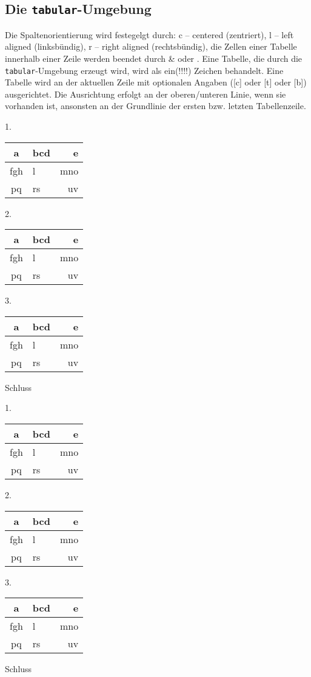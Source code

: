 \subsection{Die \texttt{tabular}-Umgebung}

Die Spaltenorientierung wird festegelgt durch: c -- centered (zentriert), l
-- left aligned (linksbündig), r -- right aligned (rechtsbündig), die
Zellen einer Tabelle innerhalb einer Zeile werden beendet durch \& oder
\cs{}\cs{}. Eine Tabelle, die durch die \texttt{tabular}-Umgebung erzeugt
wird, wird als ein(!!!!) Zeichen behandelt. Eine Tabelle wird an der
aktuellen Zeile mit optionalen Angaben ([c] oder [t] oder [b])
ausgerichtet. Die Ausrichtung erfolgt an der oberen/unteren Linie, wenn sie
vorhanden ist, ansonsten an der Grundlinie der ersten bzw. letzten
Tabellenzeile.

1.%
\begin{tabular}{|c|l|r|}
  \hline
  a & bcd & e \\
  \hline
  fgh & l & mno \\
  \hline
  pq & rs & uv \\
  \hline
\end{tabular}%
2.%
\begin{tabular}[t]{|c|l|r|}
  \hline
  a & bcd & e \\
  \hline
  fgh & l & mno \\
  \hline
  pq & rs & uv \\
  \hline
\end{tabular}%
3.%
\begin{tabular}[b]{|c|l|r|}
  \hline
  a & bcd & e \\
  \hline
  fgh & l & mno \\
  \hline
  pq & rs & uv \\
  \hline
\end{tabular}%
Schluss

1.%
\begin{tabular}{|c|l|r|}
  \hline
  a & bcd & e \\
  \hline
  fgh & l & mno \\
  \hline
  pq & rs & uv \\
  \hline
\end{tabular}%
2.%
\begin{tabular}[t]{|c|l|r|}
  a & bcd & e \\
  \hline
  fgh & l & mno \\
  \hline
  pq & rs & uv \\
  \hline
\end{tabular}%
3.%
\begin{tabular}[b]{|c|l|r|}
  \hline
  a & bcd & e \\
  \hline
  fgh & l & mno \\
  \hline
  pq & rs & uv \\
\end{tabular}%
Schluss

